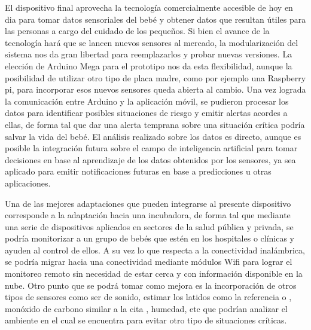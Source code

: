 \documentclass{IEEEtran}
\begin{document}
		El dispositivo final aprovecha la tecnología comercialmente accesible de hoy en dia para tomar datos sensoriales del bebé y obtener datos que resultan útiles para las personas a cargo del cuidado de los pequeños. Si bien el avance de la tecnología hará que se lancen nuevos sensores al mercado, la modularización del sistema nos da gran libertad para reemplazarlos y probar nuevas versiones. La elección de Arduino Mega para el prototipo nos da esta flexibilidad, aunque la posibilidad de utilizar otro tipo de placa madre, como por ejemplo una Raspberry pi, para incorporar esos nuevos sensores queda abierta al cambio.
		Una vez lograda la comunicación entre Arduino y la aplicación móvil, se pudieron procesar los datos para identificar posibles situaciones de riesgo y emitir alertas acordes a ellas, de forma tal que dar una alerta temprana sobre una situación crítica podría salvar la vida del bebé. El análisis realizado sobre los datos es directo, aunque es posible la integración futura sobre el campo de inteligencia artificial para tomar decisiones en base al aprendizaje de los datos obtenidos por los sensores, ya sea aplicado para emitir notificaciones futuras en base a predicciones u otras aplicaciones.


		Una de las mejores adaptaciones que pueden integrarse al presente dispositivo corresponde a la adaptación hacia una incubadora, de forma tal que mediante una serie de dispositivos aplicados en sectores de la salud pública y privada, se podría monitorizar a un grupo de bebés que estén en los hospitales o clínicas y ayuden al control de ellos. A su vez lo que respecta a la conectividad inalámbrica, se podría migrar hacia una conectividad mediante módulos Wifi para lograr el monitoreo remoto sin necesidad de estar cerca y con información disponible en la nube. Otro punto que se podrá tomar como mejora es la incorporación de otros tipos de sensores como ser de sonido, estimar los latidos como la referencia \cite{lindberg1996estimation} o \cite{scanlon1996sudden}, monóxido de carbono similar a la cita \cite{esquiroz2017diseno}, humedad, etc que podrían analizar el ambiente en el cual se encuentra para evitar otro tipo de situaciones críticas.

			
\end{document}

